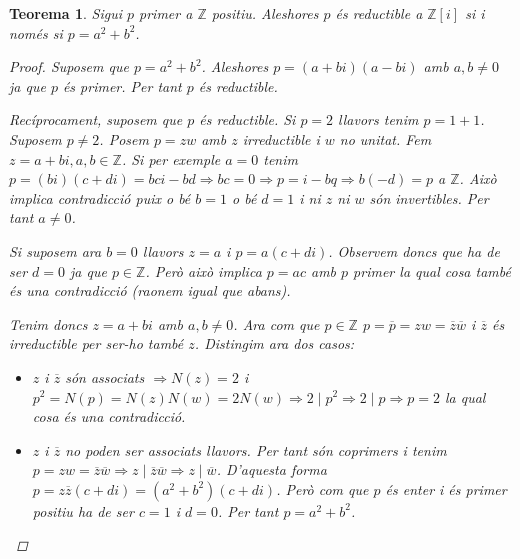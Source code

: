 \documentclass[a4paper,11pt]{report}
\renewcommand{\div}{\mid}
\renewcommand{\bar}{\overline}
\newcommand{\im}{\Rightarrow}
\theoremstyle{theorem}
\newtheorem{teorema}{\normalfont \sffamily\bfseries Teorema}[section]
\theoremstyle{definition}
\begin{document}
\begin{teorema}
	Sigui $p$ primer a $\mathbb{Z}$ positiu. Aleshores $p$ és reductible a $\mathbb{Z}[i]$ si i només si $p=a^2+b^2$.
	\begin{proof}
		Suposem que $p=a^2+b^2$. Aleshores $p=(a+bi)(a-bi)$ amb $a,b\neq 0$ ja que $p$ és primer. Per tant $p$ és reductible.
		
		Recíprocament, suposem que $p$ és reductible. Si $p=2$ llavors tenim $p=1+1$. Suposem $p\neq 2$. Posem $p=zw$ amb $z$ irreductible i $w$ no unitat. Fem $z=a+bi,a,b\in\mathbb{Z}$. Si per exemple $a=0$ tenim $p=(bi)(c+di)=bci-bd\im bc=0\im p=i-bq\im b(-d)=p$ a $\mathbb{Z}$. Això implica contradicció puix o bé $b=1$ o bé $d=1$ i ni $z$ ni $w$ són invertibles. Per tant $a\neq 0$.
		
		Si suposem ara $b=0$ llavors $z=a$ i $p=a(c+di)$. Observem doncs que ha de ser $d=0$ ja que $p\in\mathbb{Z}$. Però això implica $p=ac$ amb $p$ primer la qual cosa també és una contradicció (raonem igual que abans).
		
		Tenim doncs $z=a+bi$ amb $a,b\neq 0$. Ara com que $p\in\mathbb{Z}$ $p=\bar{p}=zw=\bar{z}\bar{w}$ i $\bar{z}$ és irreductible per ser-ho també $z$. Distingim ara dos casos:
		\begin{itemize}
			\item $z$ i $\bar{z}$ són associats $\im N(z)=2$ i $p^2=N(p)=N(z)N(w)=2N(w)\im 2\mid p^2\im 2\mid p\im p=2$ la qual cosa és una contradicció.
			\item $z$ i $\bar{z}$ no poden ser associats llavors. Per tant són coprimers i tenim $p=zw=\bar{z}\bar{w}\im z\div \bar{z}\bar{w}\im z\div \bar{w}$. D'aquesta forma $p=z\bar{z}(c+di)=(a^2+b^2)(c+di)$. Però com que $p$ és enter i és primer positiu ha de ser $c=1$ i $d=0$. Per tant $p=a^2+b^2$.
		\end{itemize}
	\end{proof}
\end{teorema}
\end{document}
